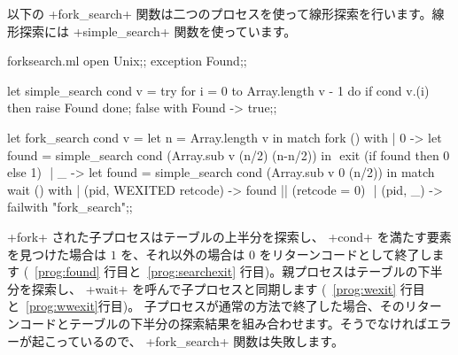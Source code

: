 \begin{example}
\label{ex/forksearch}
以下の \ml+fork_search+ 関数は二つのプロセスを使って線形探索を行います。線形探索には \ml+simple_search+ 関数を使っています。
%
\begin{listingcodefile}[style=numbers]{forksearch.ml}
open Unix;;
exception Found;;

let simple_search cond v =
 try
   for i = 0 to Array.length v - 1 do
     if cond v.(i) then raise Found
   done;
   false
 with Found -> true;;

let fork_search cond v =
 let n = Array.length v in
 match fork () with
 | 0 ->
     let found = simple_search cond (Array.sub v (n/2) (n-n/2)) in $\label{prog:found}$
     exit (if found then 0 else 1) $\label{prog:searchexit}$
 | _ ->
     let found = simple_search cond (Array.sub v 0 (n/2)) in
     match wait () with
     | (pid, WEXITED retcode) -> found || (retcode = 0) $\label{prog:wexit}$
     | (pid, _)               -> failwith "fork_search";;$\label{prog:wwexit}$
\end{listingcodefile}
%
\ml+fork+ された子プロセスはテーブルの上半分を探索し、 \ml+cond+ を満たす要素を見つけた場合は $1$ を、それ以外の場合は $0$ をリターンコードとして終了します (~\ref{prog:found} 行目と~\ref{prog:searchexit} 行目)。親プロセスはテーブルの下半分を探索し、 \ml+wait+ を呼んで子プロセスと同期します (~\ref{prog:wexit} 行目と~\ref{prog:wwexit}行目)。 子プロセスが通常の方法で終了した場合、そのリターンコードとテーブルの下半分の探索結果を組み合わせます。そうでなければエラーが起こっているので、 \ml+fork_search+ 関数は失敗します。
\end{example}

